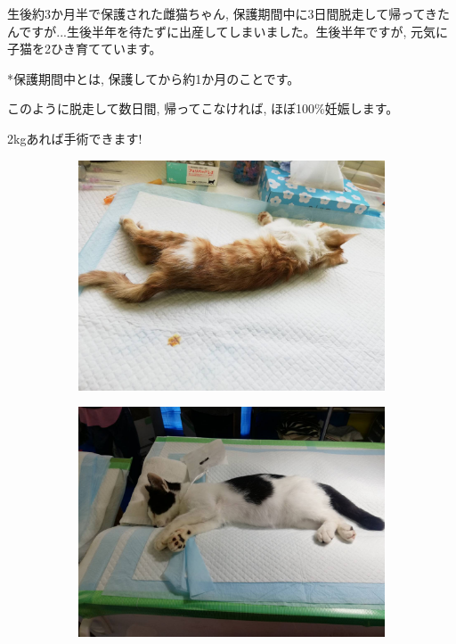 \documentclass{jsarticle}
\begin{document}
\Large
  生後約3か月半で保護された雌猫ちゃん, 保護期間中に3日間脱走して帰ってきたんですが...生後半年を待たずに出産してしまいました。生後半年ですが, 元気に子猫を2ひき育てています。

  *保護期間中とは, 保護してから約1か月のことです。

	このように脱走して数日間, 帰ってこなければ, ほぼ100\%妊娠します。






\newpage
\huge
  2\si{\kilogram}あれば手術できます!

	\begin{figure}[htbp]
		\centering
		\begin{subfigure}{0.4\columnwidth}
			\centering
			\includegraphics[width=\columnwidth]{3.jpg}
		\end{subfigure}
		\begin{subfigure}{0.4\columnwidth}
			\centering
			\includegraphics[width=\columnwidth]{4.jpg}
		\end{subfigure}
	\end{figure}
\end{document}
